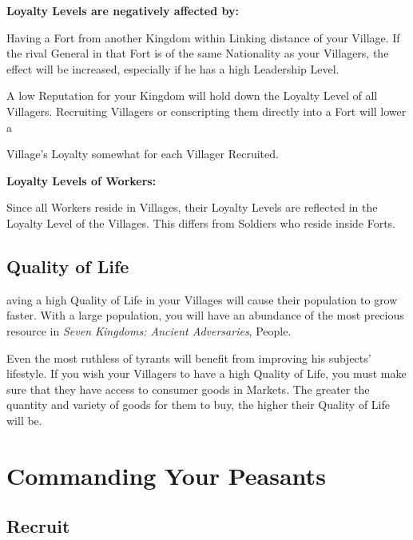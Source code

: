 
\textbf{Loyalty Levels are negatively affected by:}

\begin{changemargin}{.5cm}{0cm}
Having a Fort from another Kingdom within Linking distance of your Village. If the rival General in that Fort is of the same Nationality as your Villagers, the effect will be increased, especially if he has a high Leadership Level.

A low Reputation for your Kingdom will hold down the Loyalty Level of all Villagers.
Recruiting Villagers or conscripting them directly into a Fort will lower a 

Village’s Loyalty somewhat for each Villager Recruited.
\end{changemargin}


\textbf{Loyalty Levels of Workers:}

\begin{changemargin}{.5cm}{0cm}
Since all Workers reside in Villages, their Loyalty Levels are reflected in the Loyalty Level of the Villages. This differs from Soldiers who reside inside Forts.
\end{changemargin}

\subsection{Quality of Life}


aving a high Quality of Life in your Villages will cause their population to grow faster. With a large population, you will have an abundance of the most precious resource in \textit{Seven Kingdoms: Ancient Adversaries}, People.

Even the most ruthless of tyrants will benefit from improving his subjects’ lifestyle. If you wish your Villagers to have a high Quality of Life, you must make sure that they have access to consumer goods in Markets. The greater the quantity and variety of goods for them to buy, the higher their Quality of Life will be.

\section{\textsf{Commanding Your Peasants}}


\subsection{\textsf{Recruit}}

